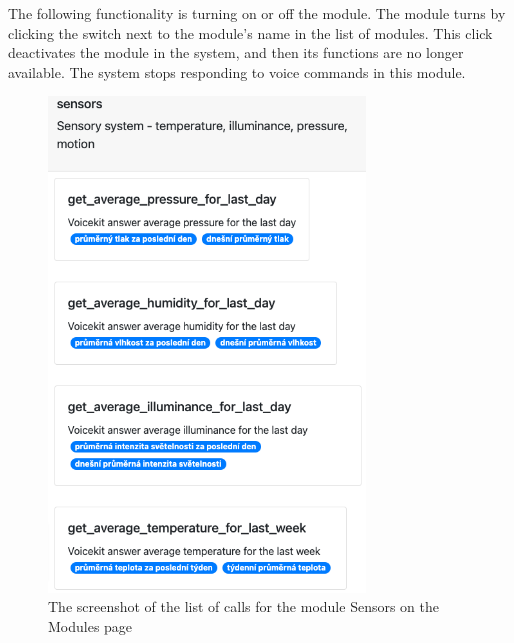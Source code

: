 The following functionality is turning on or off the module. The module turns by clicking the switch next to the module's name in the list of modules. This click deactivates the module in the system, and then its functions are no longer available. The system stops responding to voice commands in this module.

\begin{figure}[H]
    \centering
    \includegraphics[width=0.75\textwidth]{img/screenshot_modules_calls.png}
    \caption{The screenshot of the list of calls for the module Sensors on the Modules page}
    \label{fig:screenshot_modules_calls}
\end{figure}
